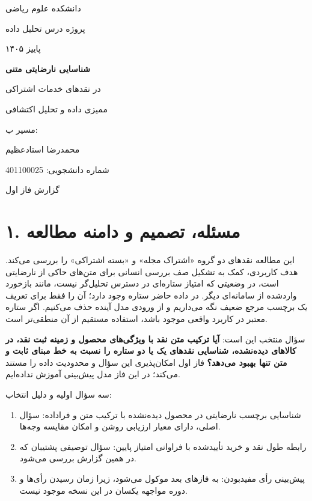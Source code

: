 \documentclass[a4paper,12pt]{article}
\newcommand{\pageheading}[1]{\section*{\color{ink}#1}}
\begin{document}
\begin{titlepage}
\centering
\vspace*{2cm}
{\Large دانشکده علوم ریاضی\par}
\vspace{1cm}
{\Large پروژه درس تحلیل داده\par}
{\large پاییز ۱۴۰۵\par}
\vspace{1.8cm}
{\Huge\bfseries\color{ink} شناسایی نارضایتی متنی\par}
\vspace{.35cm}
{\LARGE در نقدهای خدمات اشتراکی\par}
\vspace{.8cm}
{\Large ممیزی داده و تحلیل اکتشافی\par}
{\large مسیر ب: \par}
\vspace{1.7cm}
{\Large محمدرضا استادعظیم\par}
\vspace{.3cm}
{\large شماره دانشجویی: \num{401100025}\par}
\vfill
گزارش فاز اول\par
\end{titlepage}

\pageheading{۱. مسئله، تصمیم و دامنه مطالعه}
این مطالعه نقدهای دو گروه «اشتراک مجله» و «بسته اشتراکی» را بررسی می‌کند. هدف کاربردی، کمک به تشکیل صف بررسی انسانی برای متن‌های حاکی از نارضایتی است، در وضعیتی که امتیاز ستاره‌ای در دسترس تحلیل‌گر نیست، مانند بازخورد واردشده از سامانه‌ای دیگر. در داده حاضر ستاره وجود دارد؛ آن را فقط برای تعریف یک برچسب مرجع ضعیف نگه می‌داریم و از ورودی مدل آینده حذف می‌کنیم. اگر ستاره معتبر در کاربرد واقعی موجود باشد، استفاده مستقیم از آن منطقی‌تر است.

سؤال منتخب این است: \textbf{آیا ترکیب متن نقد با ویژگی‌های محصول و زمینه ثبت نقد، در کالاهای دیده‌نشده، شناسایی نقدهای یک یا دو ستاره را نسبت به خط مبنای ثابت و متن تنها بهبود می‌دهد؟} فاز اول امکان‌پذیری این سؤال و محدودیت داده را مستند می‌کند؛ در این فاز مدل پیش‌بینی آموزش نداده‌ایم.

سه سؤال اولیه و دلیل انتخاب:
\begin{enumerate}
\item شناسایی برچسب نارضایتی در محصول دیده‌نشده با ترکیب متن و فراداده: سؤال اصلی، دارای معیار ارزیابی روشن و امکان مقایسه وجه‌ها.
\item رابطه طول نقد و خرید تأییدشده با فراوانی امتیاز پایین: سؤال توصیفی پشتیبان که در همین گزارش بررسی می‌شود.
\item پیش‌بینی رأی مفیدبودن: به فازهای بعد موکول می‌شود، زیرا زمان رسیدن رأی‌ها و دوره مواجهه یکسان در این نسخه موجود نیست.
\end{enumerate}
\end{document}

